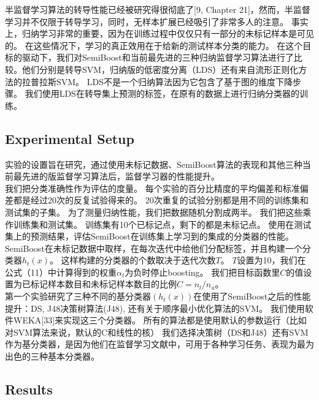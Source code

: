 \documentclass[10pt,journal,compsoc]{IEEEtran}
\begin{document}
半监督学习算法的转导性能已经被研究得很彻底了[9, Chapter 21]，然而，半监督学习并不仅限于转导学习，同时，无样本扩展已经吸引了非常多人的注意。
事实上，归纳学习非常的重要，因为在训练过程中仅仅只有一部分的未标记样本是可见的。
在这些情况下，学习的真正效用在于给新的测试样本分类的能力。
在这个目标的驱动下，我们对SemiBoost和当前最先进的三种归纳监督学习算法进行了比较。他们分别是转导SVM，归纳版的低密度分离（LDS）还有来自流形正则化方法的拉普拉斯SVM。
LDS不是一个归纳算法因为它包含了基于图的维度下降步骤。
我们使用LDS在转导集上预测的标签，在原有的数据上进行归纳分类器的训练。

\subsection{Experimental Setup}
实验的设置旨在研究，通过使用未标记数据、SemiBoost算法的表现和其他三种当前最先进的版监督学习算法后，监督学习器的性能提升。\\

我们把分类准确性作为评估的度量。
每个实验的百分比精度的平均偏差和标准偏差都是经过20次的反复试验得来的。
20次重复的试验分别都是用不同的训练集和测试集的子集。
为了测量归纳性能，我们把数据随机分割成两半。
我们把这些乘作训练集和测试集。
训练集有10个已标记点，剩下的都是未标记点。
使用在测试集上的预测结果，评估SemiBoost在训练集上学习到的集成的分类器的性能。\\

SemiBoost在未标记数据中取样，在每次迭代中给他们分配标签，并且构建一个分类器$h_t(x)$。
这样构建的分类器的个数取决于迭代次数$T$。
$T$设置为10，我们在公式（11）中计算得到的权重$\alpha_t$为负时停止boosting。
我们把目标函数里$C$的值设置为已标记样本数目和未标记样本数目的比例$C=n_l/n_u$。\\

第一个实验研究了三种不同的基分类器$(h_t(x))$在使用了SemiBoost之后的性能提升：DS, J48决策树算法(J48), 还有关于顺序最小优化算法的SVM。
我们使用软件WEKA[33]来实现这三个分类器。
所有的算法都是使用默认的参数运行（比如对SVM算法来说，默认的C和线性的核）
我们选择决策树（DS和J48）还有SVM作为基分类器，是因为他们在监督学习文献中，可用于各种学习任务、表现为最为出色的三种基本分类器。

\subsection{Results}
\end{document}
